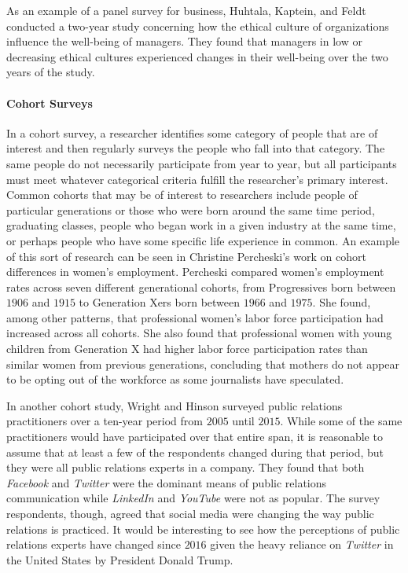 As an example of a panel survey for business, Huhtala, Kaptein, and Feldt conducted a two-year study concerning how the ethical culture of organizations influence the well-being of managers\cite{huhtala2016perceived}. They found that managers in low or decreasing ethical cultures experienced changes in their well-being over the two years of the study.

\paragraph{Cohort Surveys}

In a cohort survey, a researcher identifies some category of people that are of interest and then regularly surveys the people who fall into that category. The same people do not necessarily participate from year to year, but all participants must meet whatever categorical criteria fulfill the researcher's primary interest. Common cohorts that may be of interest to researchers include people of particular generations or those who were born around the same time period, graduating classes, people who began work in a given industry at the same time, or perhaps people who have some specific life experience in common. An example of this sort of research can be seen in Christine Percheski's work on cohort differences in women's employment\cite{percheski2008opting}. Percheski compared women's employment rates across seven different generational cohorts, from Progressives born between $ 1906 $ and $ 1915 $ to Generation Xers born between $ 1966 $ and $ 1975 $. She found, among other patterns, that professional women's labor force participation had increased across all cohorts. She also found that professional women with young children from Generation X had higher labor force participation rates than similar women from previous generations, concluding that mothers do not appear to be opting out of the workforce as some journalists have speculated.

In another cohort study, Wright and Hinson surveyed public relations practitioners over a ten-year period from $ 2005 $ until $ 2015 $\cite{wright2015examining}. While some of the same practitioners would have participated over that entire span, it is reasonable to assume that at least a few of the respondents changed during that period, but they were all public relations experts in a company. They found that both \textit{Facebook} and \textit{Twitter} were the dominant means of public relations communication while \textit{LinkedIn} and \textit{YouTube} were not as popular. The survey respondents, though, agreed that social media were changing the way public relations is practiced. It would be interesting to see how the perceptions of public relations experts have changed since $ 2016 $ given the heavy reliance on \textit{Twitter} in the United States by President Donald Trump.

